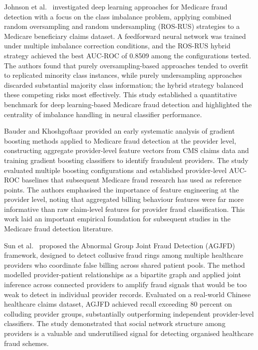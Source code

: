 Johnson et al.\ \cite{johnson2019} investigated deep learning approaches for Medicare fraud detection with a focus on the class imbalance problem, applying combined random oversampling and random undersampling (ROS-RUS) strategies to a Medicare beneficiary claims dataset. A feedforward neural network was trained under multiple imbalance correction conditions, and the ROS-RUS hybrid strategy achieved the best AUC-ROC of 0.8509 among the configurations tested. The authors found that purely oversampling-based approaches tended to overfit to replicated minority class instances, while purely undersampling approaches discarded substantial majority class information; the hybrid strategy balanced these competing risks most effectively. This study established a quantitative benchmark for deep learning-based Medicare fraud detection and highlighted the centrality of imbalance handling in neural classifier performance.

Bauder and Khoshgoftaar \cite{bauder2017} provided an early systematic analysis of gradient boosting methods applied to Medicare fraud detection at the provider level, constructing aggregate provider-level feature vectors from CMS claims data and training gradient boosting classifiers to identify fraudulent providers. The study evaluated multiple boosting configurations and established provider-level AUC-ROC baselines that subsequent Medicare fraud research has used as reference points. The authors emphasised the importance of feature engineering at the provider level, noting that aggregated billing behaviour features were far more informative than raw claim-level features for provider fraud classification. This work laid an important empirical foundation for subsequent studies in the Medicare fraud detection literature.

Sun et al.\ \cite{sun2018} proposed the Abnormal Group Joint Fraud Detection (AGJFD) framework, designed to detect collusive fraud rings among multiple healthcare providers who coordinate false billing across shared patient pools. The method modelled provider-patient relationships as a bipartite graph and applied joint inference across connected providers to amplify fraud signals that would be too weak to detect in individual provider records. Evaluated on a real-world Chinese healthcare claims dataset, AGJFD achieved recall exceeding 80 percent on colluding provider groups, substantially outperforming independent provider-level classifiers. The study demonstrated that social network structure among providers is a valuable and underutilised signal for detecting organised healthcare fraud schemes.

